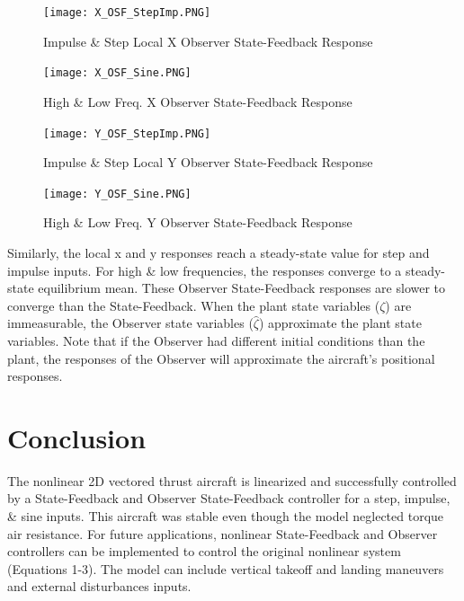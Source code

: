 \documentclass[conference]{IEEEtran}
\begin{document}
\begin{figure}[htbp]
\centering
\centerline{\texttt{[image: X\_OSF\_StepImp.PNG]}}
\caption{Impulse \& Step Local X Observer State-Feedback Response}
\label{figure}
\end{figure}

\begin{figure}[htbp]
\centering
\centerline{\texttt{[image: X\_OSF\_Sine.PNG]}}
\caption{High \& Low Freq. X Observer State-Feedback Response}
\label{figure}
\vspace{-5mm}
\end{figure}

\begin{figure}[htbp]
\centering
\centerline{\texttt{[image: Y\_OSF\_StepImp.PNG]}}
\caption{Impulse \& Step Local Y Observer State-Feedback Response}
\label{figure}
\end{figure}

\begin{figure}[htbp]
\centering
\centerline{\texttt{[image: Y\_OSF\_Sine.PNG]}}
\caption{High \& Low Freq. Y Observer State-Feedback Response}
\label{figure}
\end{figure}

\newpage
Similarly, the local x and y responses reach a steady-state value for step and impulse inputs. For high \& low frequencies, the responses converge to a steady-state equilibrium mean.  These Observer State-Feedback responses are slower to converge than the State-Feedback. When the plant state variables ($\zeta$) are immeasurable, the Observer state variables ($\hat{\zeta}$) approximate the plant state variables. Note that if the Observer had different initial conditions than the plant, the responses of the Observer will approximate the aircraft's positional responses. 

\section{Conclusion}
The nonlinear 2D vectored thrust aircraft is linearized and successfully controlled by a State-Feedback and Observer State-Feedback controller for a step, impulse, \& sine inputs. This aircraft was stable even though the model neglected torque air resistance.  For future applications, nonlinear State-Feedback and Observer controllers can be implemented to control the original nonlinear system (Equations 1-3). The model can include vertical takeoff and landing maneuvers and external disturbances inputs. \\
\end{document}
